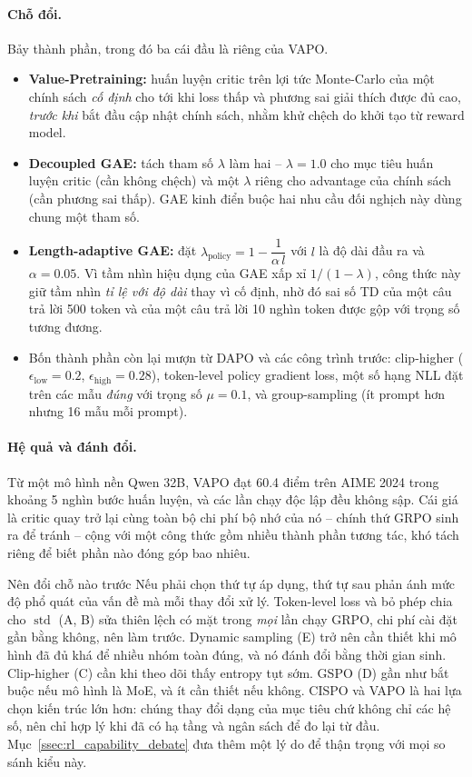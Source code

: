 \paragraph{Chỗ đổi.} Bảy thành phần, trong đó ba cái đầu là riêng của VAPO.
\begin{itemize}
	\item \textbf{Value-Pretraining:} huấn luyện critic trên lợi tức Monte-Carlo của một chính sách \emph{cố định} cho tới khi loss thấp và phương sai giải thích được đủ cao, \emph{trước khi} bắt đầu cập nhật chính sách, nhằm khử chệch do khởi tạo từ reward model.
	\item \textbf{Decoupled GAE:} tách tham số $\lambda$ làm hai -- $\lambda = 1.0$ cho mục tiêu huấn luyện critic (cần không chệch) và một $\lambda$ riêng cho advantage của chính sách (cần phương sai thấp). GAE kinh điển buộc hai nhu cầu đối nghịch này dùng chung một tham số.
	\item \textbf{Length-adaptive GAE:} đặt $\lambda_{\text{policy}} = 1 - \dfrac{1}{\alpha\,l}$ với $l$ là độ dài đầu ra và $\alpha = 0.05$. Vì tầm nhìn hiệu dụng của GAE xấp xỉ $1/(1-\lambda)$, công thức này giữ tầm nhìn \emph{tỉ lệ với độ dài} thay vì cố định, nhờ đó sai số TD của một câu trả lời 500 token và của một câu trả lời 10 nghìn token được gộp với trọng số tương đương.
	\item Bốn thành phần còn lại mượn từ DAPO và các công trình trước: clip-higher ($\epsilon_{\mathrm{low}} = 0.2$, $\epsilon_{\mathrm{high}} = 0.28$), token-level policy gradient loss, một số hạng NLL đặt trên các mẫu \emph{đúng} với trọng số $\mu = 0.1$, và group-sampling (ít prompt hơn nhưng 16 mẫu mỗi prompt).
\end{itemize}

\paragraph{Hệ quả và đánh đổi.}
Từ một mô hình nền Qwen 32B, VAPO đạt 60.4 điểm trên AIME 2024 trong khoảng 5 nghìn bước huấn luyện, và các lần chạy độc lập đều không sập. Cái giá là critic quay trở lại cùng toàn bộ chi phí bộ nhớ của nó -- chính thứ GRPO sinh ra để tránh -- cộng với một công thức gồm nhiều thành phần tương tác, khó tách riêng để biết phần nào đóng góp bao nhiêu.

\begin{assess}{Nên đổi chỗ nào trước}
Nếu phải chọn thứ tự áp dụng, thứ tự sau phản ánh mức độ phổ quát của vấn đề mà mỗi thay đổi xử lý. Token-level loss và bỏ phép chia cho $\operatorname{std}$ (A, B) sửa thiên lệch có mặt trong \emph{mọi} lần chạy GRPO, chi phí cài đặt gần bằng không, nên làm trước. Dynamic sampling (E) trở nên cần thiết khi mô hình đã đủ khá để nhiều nhóm toàn đúng, và nó đánh đổi bằng thời gian sinh. Clip-higher (C) cần khi theo dõi thấy entropy tụt sớm. GSPO (D) gần như bắt buộc nếu mô hình là MoE, và ít cần thiết nếu không. CISPO và VAPO là hai lựa chọn kiến trúc lớn hơn: chúng thay đổi dạng của mục tiêu chứ không chỉ các hệ số, nên chỉ hợp lý khi đã có hạ tầng và ngân sách để đo lại từ đầu. Mục~\ref{ssec:rl_capability_debate} đưa thêm một lý do để thận trọng với mọi so sánh kiểu này.
\end{assess}

